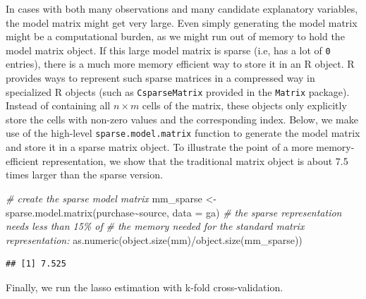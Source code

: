 \documentclass[
  12pt,
]{style/krantz}
\newenvironment{Shaded}{\begin{snugshade}}{\end{snugshade}}
\newcommand{\AttributeTok}[1]{\textcolor[rgb]{0.77,0.63,0.00}{#1}}
\newcommand{\CommentTok}[1]{\textcolor[rgb]{0.56,0.35,0.01}{\textit{#1}}}
\newcommand{\FunctionTok}[1]{\textcolor[rgb]{0.00,0.00,0.00}{#1}}
\newcommand{\NormalTok}[1]{#1}
\newcommand{\OtherTok}[1]{\textcolor[rgb]{0.56,0.35,0.01}{#1}}
\newcommand{\SpecialCharTok}[1]{\textcolor[rgb]{0.00,0.00,0.00}{#1}}
\newcommand{\StringTok}[1]{\textcolor[rgb]{0.31,0.60,0.02}{#1}}
\begin{document}
In cases with both many observations and many candidate explanatory variables, the model matrix might get very large. Even simply generating the model matrix might be a computational burden, as we might run out of memory to hold the model matrix object. If this large model matrix is sparse (i.e, has a lot of \texttt{0} entries), there is a much more memory efficient way to store it in an R object. R provides ways to represent such sparse matrices in a compressed way in specialized R objects (such as \texttt{CsparseMatrix} provided in the \texttt{Matrix} package). Instead of containing all \(n\times m\) cells of the matrix, these objects only explicitly store the cells with non-zero values and the corresponding index. Below, we make use of the high-level \texttt{sparse.model.matrix} function to generate the model matrix and store it in a sparse matrix object. To illustrate the point of a more memory-efficient representation, we show that the traditional matrix object is about 7.5 times larger than the sparse version.

\begin{Shaded}
\begin{Highlighting}[]
\CommentTok{\# create the sparse model matrix}
\NormalTok{mm\_sparse }\OtherTok{\textless{}{-}} \FunctionTok{sparse.model.matrix}\NormalTok{(purchase}\SpecialCharTok{\textasciitilde{}}\NormalTok{source, }\AttributeTok{data =}\NormalTok{ ga)}
\CommentTok{\# the sparse representation needs less than 15\% of }
\CommentTok{\# the memory needed for the standard matrix representation:}
\FunctionTok{as.numeric}\NormalTok{(}\FunctionTok{object.size}\NormalTok{(mm)}\SpecialCharTok{/}\FunctionTok{object.size}\NormalTok{(mm\_sparse))}
\end{Highlighting}
\end{Shaded}

\begin{verbatim}
## [1] 7.525
\end{verbatim}

Finally, we run the lasso estimation with k-fold cross-validation.

\begin{Shaded}
\end{Shaded}
\end{document}
